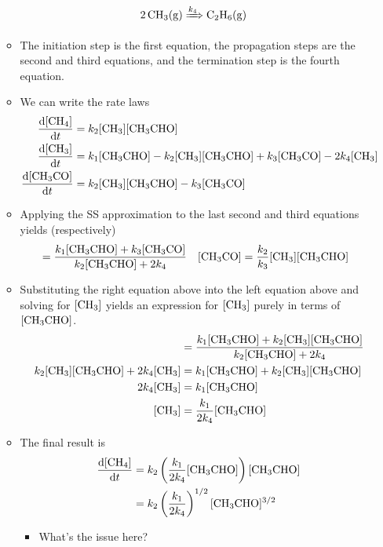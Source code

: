 \documentclass[../notes.tex]{subfiles}
\begin{document}
\begin{itemize}
\begin{itemize}
\begin{align*}
            \ce{2CH3(g)} &\xRightarrow{k_4} \ce{C2H6(g)}
        \end{align*}
        \item The initiation step is the first equation, the propagation steps are the second and third equations, and the termination step is the fourth equation.
        \item We can write the rate laws
        \begin{align*}
            \dv{[\ce{CH4}]}{t} &= k_2[\ce{CH3}][\ce{CH3CHO}]\\
            \dv{[\ce{CH3}]}{t} &= k_1[\ce{CH3CHO}]-k_2[\ce{CH3}][\ce{CH3CHO}]+k_3[\ce{CH3CO}]-2k_4[\ce{CH3}]\\
            \dv{[\ce{CH3CO}]}{t} &= k_2[\ce{CH3}][\ce{CH3CHO}]-k_3[\ce{CH3CO}]
        \end{align*}
        \item Applying the SS approximation to the last second and third equations yields (respectively)
        \begin{align*}
            [\ce{CH3}] &= \frac{k_1[\ce{CH3CHO}]+k_3[\ce{CH3CO}]}{k_2[\ce{CH3CHO}]+2k_4}&
            [\ce{CH3CO}] &= \frac{k_2}{k_3}[\ce{CH3}][\ce{CH3CHO}]
        \end{align*}
        \item Substituting the right equation above into the left equation above and solving for $[\ce{CH3}]$ yields an expression for $[\ce{CH3}]$ purely in terms of $[\ce{CH3CHO}]$.
        \begin{align*}
            [\ce{CH3}] &= \frac{k_1[\ce{CH3CHO}]+k_2[\ce{CH3}][\ce{CH3CHO}]}{k_2[\ce{CH3CHO}]+2k_4}\\
            k_2[\ce{CH3}][\ce{CH3CHO}]+2k_4[\ce{CH3}] &= k_1[\ce{CH3CHO}]+k_2[\ce{CH3}][\ce{CH3CHO}]\\
            2k_4[\ce{CH3}] &= k_1[\ce{CH3CHO}]\\
            [\ce{CH3}] &= \frac{k_1}{2k_4}[\ce{CH3CHO}]
        \end{align*}
        \item The final result is
        \begin{align*}
            \dv{[\ce{CH4}]}{t} &= k_2\left( \frac{k_1}{2k_4}[\ce{CH3CHO}] \right)[\ce{CH3CHO}]\\
            &= k_2\left( \frac{k_1}{2k_4} \right)^{1/2}[\ce{CH3CHO}]^{3/2}
        \end{align*}
        \begin{itemize}
            \item What's the issue here?
        \end{itemize}
    \end{itemize}
\end{itemize}
\end{document}
